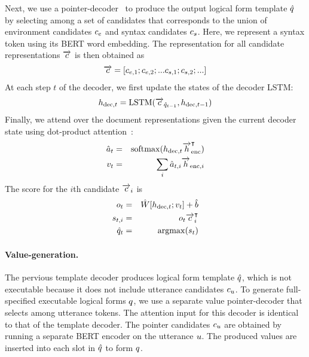 \documentclass[11pt,a4paper]{article}
\begin{document}
Next, we use a pointer-decoder~\citep{vinyals-pointer_networks} to produce the output logical form template ${\hat{{q}}}$ by selecting among a set of candidates that corresponds to the union of environment candidates ${c}_{e}$ and syntax candidates ${c}_{s}$.
Here, we represent a syntax token using its BERT word embedding.
The representation for all candidate representations ${{\overrightarrow{c}}}$ is then obtained as
\begin{eqnarray}
{{\overrightarrow{c}}} = {[{c}_{{e}, 1}; {c}_{{e},2}; ... {c}_{{s}, 1};  {c}_{{s}, 2}; ...]}
\end{eqnarray}
At each step $t$ of the decoder, we first update the states of the decoder LSTM:
\begin{eqnarray}
{h}_{{\rm dec}, t} = {\rm LSTM}({\overrightarrow{{c}}}_{{\hat{{q}}}_{t-1}}, {h}_{{\rm dec}, t-1})
\end{eqnarray}
Finally, we attend over the document representations given the current decoder state using dot-product attention~\citep{bahdanau-align_and_translate}:
\begin{eqnarray}
\hat{a}_t &=& {\rm softmax}( {h}_{{\rm dec}, t} {\overrightarrow{{h}}}_{{\rm enc}} ^\intercal )\\
v_t &=& \sum_i \hat{a}_{t, i} {\overrightarrow{{h}}}_{{\rm enc}, i}
\end{eqnarray}
The score for the $i$th candidate ${{\overrightarrow{c}}}_i$ is
\begin{eqnarray}
o_t &=& \hat{W} {[{h}_{{\rm dec}, t}; v_t]} + \hat{b}\\
s_{t, i} &=& o_t {{\overrightarrow{c}}}_i^\intercal\\
{\hat{{q}}}_t &=& {{\rm argmax}}(s_{t})
\end{eqnarray}


\paragraph{Value-generation.}
The pervious template decoder produces logical form template ${\hat{{q}}}$, which is not executable because it does not include utterance candidates ${c}_{u}$.
To generate full-specified executable logical forms ${q}$, we use a separate value pointer-decoder that selects among utterance tokens.
The attention input for this decoder is identical to that of the template decoder.
The pointer candidates ${c}_{u}$ are obtained by running a separate BERT encoder on the utterance ${u}$.
The produced values are inserted into each slot in ${\hat{{q}}}$ to form ${q}$.
\end{document}

